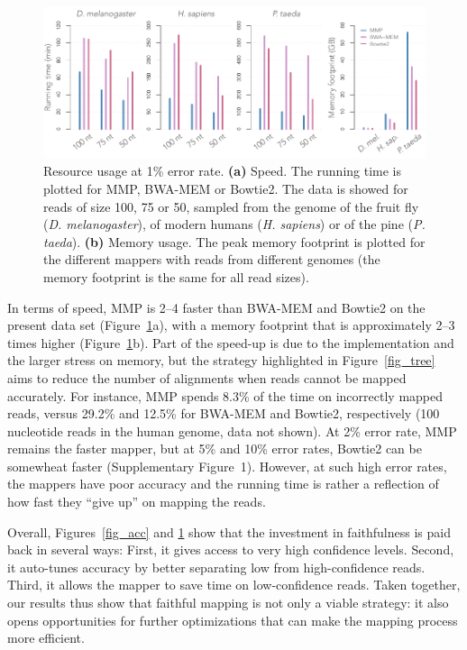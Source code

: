 \documentclass[english]{article}
\begin{document}
\begin{figure}[h]
\begin{center}
\includegraphics[scale=.7]{fig_timem.pdf}
\end{center}
\caption{Resource usage at 1\% error rate. \textbf{(a)} Speed. The running
time is plotted for MMP, BWA-MEM or Bowtie2. The data is showed for reads
of size 100, 75 or 50, sampled from the genome of the fruit fly
(\textit{D. melanogaster}), of modern humans (\textit{H. sapiens}) or of
the pine (\textit{P. taeda}). \textbf{(b)} Memory usage. The peak memory
footprint is plotted for the different mappers with reads from different
genomes (the memory footprint is the same for all read sizes).}
\label{fig_timem}
\end{figure}

In terms of speed, MMP is 2--4 faster than BWA-MEM and Bowtie2 on the
present data set (Figure~\ref{fig_timem}a), with a memory footprint that
is approximately 2--3 times higher (Figure~\ref{fig_timem}b). Part of the
speed-up is due to the implementation and the larger stress on memory, but
the strategy highlighted in Figure~\ref{fig_tree} aims to reduce the
number of alignments when reads cannot be mapped accurately. For instance,
MMP spends 8.3\% of the time on incorrectly mapped reads, versus 29.2\%
and 12.5\% for BWA-MEM and Bowtie2, respectively (100 nucleotide reads in
the human genome, data not shown). At 2\% error rate, MMP remains the
faster mapper, but at 5\% and 10\% error rates, Bowtie2 can be somewheat
faster (Supplementary Figure~1). However, at such high error rates, the
mappers have poor accuracy and the running time is rather a reflection of
how fast they ``give up'' on mapping the reads.

Overall, Figures~\ref{fig_acc} and \ref{fig_timem} show that the
investment in faithfulness is paid back in several ways: First, it gives
access to very high confidence levels. Second, it auto-tunes accuracy by
better separating low from high-confidence reads. Third, it allows the
mapper to save time on low-confidence reads. Taken together, our results
thus show that faithful mapping is not only a viable strategy: it also
opens opportunities for further optimizations that can make the mapping
process more efficient.
\end{document}
